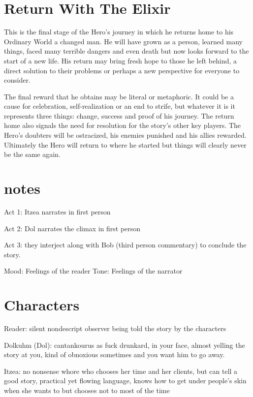 \documentclass[oneside]{book}
\begin{document}
\newpage

\chapter{Return With The Elixir}

This is the final stage of the Hero's journey in which he returns home to his Ordinary World a changed man. He will have grown as a person, learned many things, faced many terrible dangers and even death but now looks forward to the start of a new life. His return may bring fresh hope to those he left behind, a direct solution to their problems or perhaps a new perspective for everyone to consider.

The final reward that he obtains may be literal or metaphoric. It could be a cause for celebration, self-realization or an end to strife, but whatever it is it represents three things: change, success and proof of his journey. The return home also signals the need for resolution for the story's other key players. The Hero's doubters will be ostracized, his enemies punished and his allies rewarded. Ultimately the Hero will return to where he started but things will clearly never be the same again.



\newpage

\appendix

\chapter{notes}

Act 1: Itzea narrates in first person

Act 2: Dol narrates the climax in first person

Act 3: they interject along with Bob (third person commentary) to conclude the story. 

Mood: Feelings of the reader
Tone: Feelings of the narrator



\chapter{Characters}

Reader: silent nondescript observer being told the story by the characters

Dolkuhm (Dol): cantankourus as fuck drunkard, in your face, almost yelling the story at you, kind of obnoxious sometimes and you want him to go away. 

Itzea: no nonsense whore who chooses her time and her clients, but can tell a good story, practical yet flowing language, knows how to get under people's skin when she wants to but chooses not to most of the time
\end{document}
